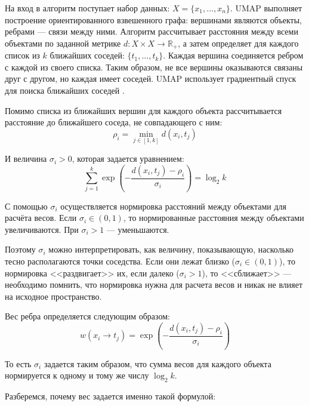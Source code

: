 На вход в алгоритм поступает набор данных: $X = \{x_1, ..., x_n\}$. UMAP выполняет построение ориентированного взвешенного графа: вершинами являются объекты, ребрами --- связи между ними. Алгоритм рассчитывает расстояния между всеми объектами по заданной метрике $d: X \times X \rightarrow \mathbb{R_+}$, а затем определяет для каждого список из $k$ ближайших соседей: $\{t_1, ..., t_k\}$. Каждая вершина соединяется ребром с каждой из своего списка. Таким образом, не все вершины оказываются связаны друг с другом, но каждая имеет соседей. UMAP использует градиентный спуск для поиска ближайших соседей \cite{mcinnes}.

Помимо списка из ближайших вершин для каждого объекта рассчитывается расстояние до ближайшего соседа, не совпадающего с ним: 
\begin{equation}
	\rho_i = \min_{j \in [1,k]} d(x_i, t_j)
\end{equation}

И величина $\sigma_i > 0$, которая задается уравнением: 
\begin{equation}
	\sum_{j=1}^{k} \exp\left(-\frac{d(x_i, t_j) - \rho_i}{\sigma_i}\right) = \log_2 k
\end{equation}

С помощью $\sigma_i$ осуществляется нормировка расстояний между объектами для расчёта весов. Если $\sigma_i \in (0,1)$, то нормированные расстояния между объектами увеличиваются. При $\sigma_i > 1$ --- уменьшаются.

Поэтому $\sigma_i$ можно интерпретировать, как величину, показывающую, насколько тесно располагаются точки соседства. Если они лежат близко ($\sigma_i \in (0,1)$), то нормировка <<раздвигает>> их, если далеко ($\sigma_i > 1$), то <<сближает>> --- необходимо помнить, что нормировка нужна для расчета весов и никак не влияет на исходное пространство.

Вес ребра определяется следующим образом:
\begin{equation}
	w(x_i \rightarrow t_j) = \exp\left(-\frac{d(x_i, t_j) - \rho_i}{\sigma_i}\right)
\end{equation}

То есть $\sigma_i$ задается таким образом, что сумма весов для каждого объекта нормируется к одному и тому же числу $\log_2 k$.

Разберемся, почему вес задается именно такой формулой:

